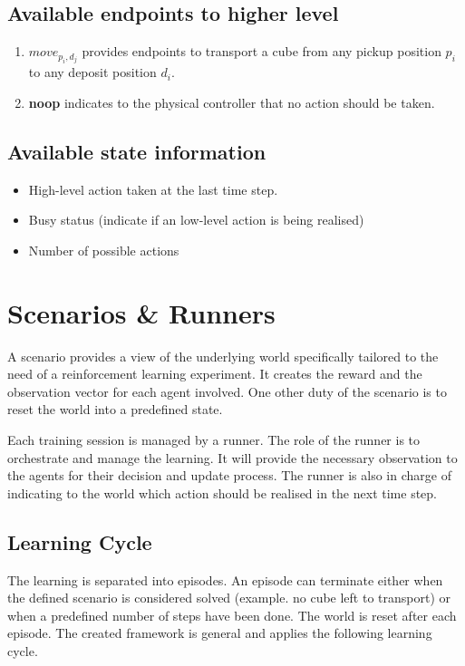 \subsection*{Available endpoints to higher level}
\begin{enumerate}[label=(\arabic*)]
\item \textbf{$move_{p_i, d_j}$} provides endpoints to transport a cube from any pickup position $p_i$ to any deposit position $d_i$.
\item \textbf{noop} indicates to the physical controller that no action should be taken.
\end{enumerate} 

\subsection*{Available state information}
\begin{itemize}[noitemsep]
\item High-level action taken at the last time step.
\item Busy status (indicate if an low-level action is being realised)
\item Number of possible actions
\end{itemize}

\section{Scenarios \& Runners}

A scenario provides a view of the underlying world specifically tailored to the need of a reinforcement learning experiment. It creates the reward and the observation vector for each agent involved. One other duty of the scenario is to reset the world into a predefined state.

Each training session is managed by a runner. The role of the runner is to orchestrate and manage the learning. It will provide the necessary observation to the agents for their decision and update process. The runner is also in charge of indicating to the world which action should be realised in the next time step.  

\subsection{Learning Cycle}

The learning is separated into episodes. An episode can terminate either when the defined scenario is considered solved (example. no cube left to transport) or when a predefined number of steps have been done. The world is reset after each episode. The created framework is general and applies the following learning cycle.

